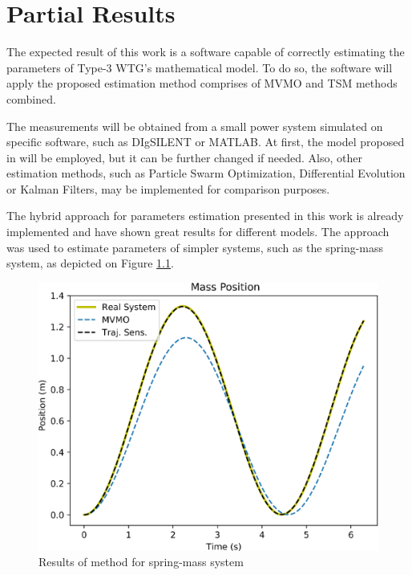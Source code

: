 \chapter{Partial Results}

\label{ch: Res}

The expected result of this work is a software capable of correctly estimating the parameters of Type-3 WTG's mathematical model. To do so, the software will apply the proposed estimation method comprises of MVMO and TSM methods combined. 

The measurements will be obtained from a small power system simulated on specific software, such as DIgSILENT or MATLAB. At first, the model proposed in \cite{Erlich2012} will be employed, but it can be further changed if needed. Also, other estimation methods, such as Particle Swarm Optimization, Differential Evolution or Kalman Filters, may be implemented for comparison purposes.

The hybrid approach for parameters estimation presented in this work is already implemented and have shown great results for different models. The approach was used to estimate parameters of simpler systems, such as the spring-mass system, as depicted on Figure \ref{fig: spring-mass}. 

\begin{figure}[h]
	\caption{Results of method for spring-mass system}
	\begin{center}
		\includegraphics[scale=0.8]{Images/SpringMass.eps}
	\end{center}
	\label{fig: spring-mass}
\end{figure}


